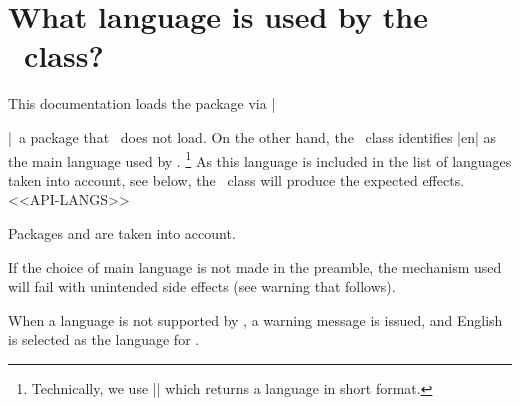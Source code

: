\documentclass{tutodoc}
\begin{document}
\section{What language is used by the \thisproj\ class?}

This documentation loads the  package via \tdoclatexin|\usepackage[english]{babel}|\, a package that \thisproj\ does not load.
On the other hand, the \thisproj\ class identifies \tdoclatexin|en| as the main language used by .%
\footnote{
    Technically, we use \tdoclatexin|| which returns a language in short format.
}
As this language is included in the list of languages taken into account, see below, the \thisproj\ class will produce the expected effects.
<<API-LANGS>>


\begin{tdocnote}
    Packages  and  are taken into account.
\end{tdocnote}


\begin{tdoccaut}
    If the choice of main language is not made in the preamble, the mechanism used will fail with unintended side effects (see warning that follows).
\end{tdoccaut}


\begin{tdocwarn}
    When a language is not supported by \thisproj, a warning message is issued, and English is selected as the language for \thisproj.
\end{tdocwarn}
\end{document}
